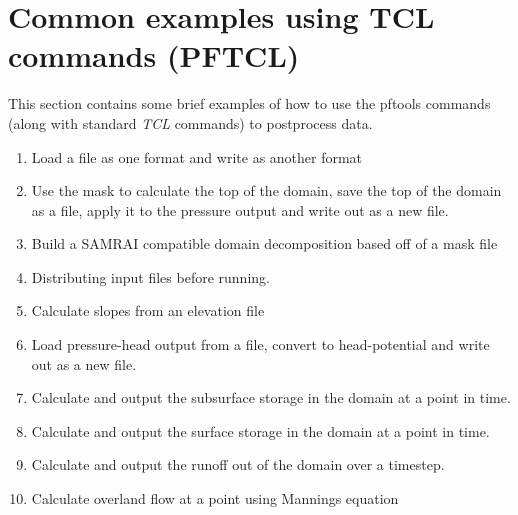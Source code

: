 \section{Common examples using \parflow{} TCL commands (PFTCL) }
\label{common_pftcl}
This section contains some brief examples of how to use the pftools commands (along with standard \emph{TCL} commands) to postprocess data.

\begin{enumerate}
\item Load a file as one format and write as another format
\item Use the mask to calculate the top of the domain, save the top of the domain as a file, apply it to the pressure output and write out as a new file.
\item Build a SAMRAI compatible domain decomposition based off of a mask file
\item Distributing input files before running.
\item Calculate slopes from an elevation file
\item Load pressure-head output from a file, convert to head-potential and write out as a new file.
\item Calculate and output the subsurface storage in the domain at a point in time.
\item Calculate and output the surface storage in the domain at a point in time.
\item Calculate and output the runoff out of the domain over a timestep.
\item Calculate overland flow at a point using Mannings equation

\end{enumerate}

